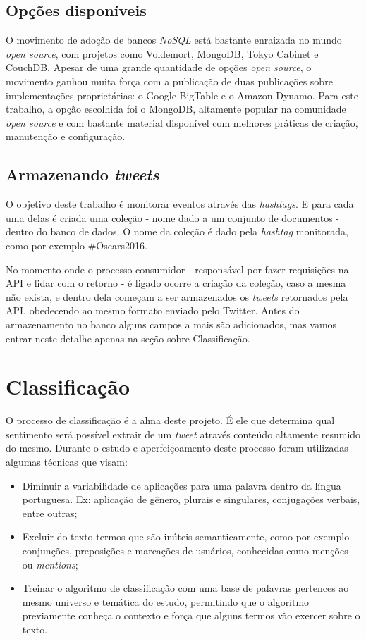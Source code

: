 \subsection{Opções disponíveis}
O movimento de adoção de bancos \textit{NoSQL} está bastante enraizada no mundo \textit{open source}, com projetos como Voldemort\cite{voldemortproject}, MongoDB\cite{mongodb}, Tokyo Cabinet\cite{tokyocabinet} e CouchDB\cite{couchdb}. Apesar de uma grande quantidade de opções \textit{open source}, o movimento ganhou muita força com a publicação de duas publicações sobre implementações proprietárias: o Google BigTable\cite{chang2008bigtable} e o Amazon Dynamo\cite{decandia2007dynamo}. Para este trabalho, a opção escolhida foi o MongoDB, altamente popular na comunidade \textit{open source} e com bastante material disponível com melhores práticas de criação, manutenção e configuração.

\subsection{Armazenando \textit{tweets}}
O objetivo deste trabalho é monitorar eventos através das \textit{hashtags}. E para cada uma delas é criada uma coleção - nome dado a um conjunto de documentos - dentro do banco de dados. O nome da coleção é dado pela \textit{hashtag} monitorada, como por exemplo \mbox{\#Oscars2016}.

No momento onde o processo consumidor - responsável por fazer requisições na API e lidar com o retorno - é ligado ocorre a criação da coleção, caso a mesma não exista, e dentro dela começam a ser armazenados os \textit{tweets} retornados pela API, obedecendo ao mesmo formato enviado pelo Twitter. Antes do armazenamento no banco alguns campos a mais são adicionados, mas vamos entrar neste detalhe apenas na seção sobre Classificação.

\section{Classificação}
O processo de classificação é a alma deste projeto. É ele que determina qual sentimento será possível extrair de um \textit{tweet} através conteúdo altamente resumido do mesmo. Durante o estudo e aperfeiçoamento deste processo foram utilizadas algumas técnicas que visam:

\begin{itemize}
	\item Diminuir a variabilidade de aplicações para uma palavra dentro da língua portuguesa. Ex: aplicação de gênero, plurais e singulares, conjugações verbais, entre outras;
	\item Excluir do texto termos que são inúteis semanticamente, como por exemplo conjunções, preposições e marcações de usuários, conhecidas como menções ou \textit{mentions};
	\item Treinar o algoritmo de classificação com uma base de palavras pertences ao mesmo universo e temática do estudo, permitindo que o algoritmo previamente conheça o contexto e força que alguns termos vão exercer sobre o texto.
\end{itemize}

